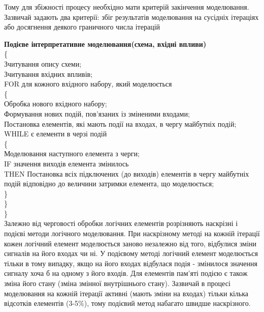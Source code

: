 \documentclass[12pt,a4paper]{article}
\begin{document}
Тому для збіжності процесу необхідно мати критерій закінчення моделювання. Зазвичай задають два критерії: збіг результатів моделювання на сусідніх ітераціях або досягнення деякого граничного числа ітерацій

\textbf{Подієве інтерпретативне моделювання(схема, вхідні впливи)}\\
\{\\
\-\hspace{1cm}  Зчитування опису схеми;\\
\-\hspace{1cm}  Зчитування вхідних впливів;\\
\-\hspace{1cm}  FOR для кожного вхідного набору, який моделюється\\
\-\hspace{1cm}  \{\\
\-\hspace{2cm}    Обробка нового вхідного набору;\\
\-\hspace{2cm}    Формування нових подій, пов’язаних із зміненими входами;\\
\-\hspace{2cm}    Постановка елементів, які мають події на входах, в чергу майбутніх подій;\\
\-\hspace{2cm}    WHILE є елементи в черзі подій\\
\-\hspace{2cm}    \{\\
\-\hspace{3cm}      Моделювання наступного елемента з черги;\\
\-\hspace{3cm}      IF значення виходів елемента змінилось\\
\-\hspace{3cm}      THEN Постановка всіх підключених (до виходів) елементів в чергу майбутніх подій відповідно до величини затримки елемента, що моделюється;\\
\-\hspace{2cm}    \}\\
\-\hspace{1cm}  \}\\
\}\\

Залежно від черговості обробки логічних елементів розрізняють наскрізні і подієві методи логічного моделювання. При наскрізному методі на кожній ітерації кожен логічний елемент моделюється заново незалежно від того, відбулися зміни сигналів на його входах чи ні. У подієвому методі логічний елемент моделюється тільки в тому випадку, якщо на його входах відбулася подія - змінилося значення сигналу хоча б на одному з його входів. Для елементів пам'яті подією є також зміна його стану (зміна змінної внутрішнього стану). Зазвичай в процесі моделювання на кожній ітерації активні (мають зміни на входах) тільки кілька відсотків елементів (3-5\%), тому подієвий метод набагато швидше наскрізного.
\end{document}
